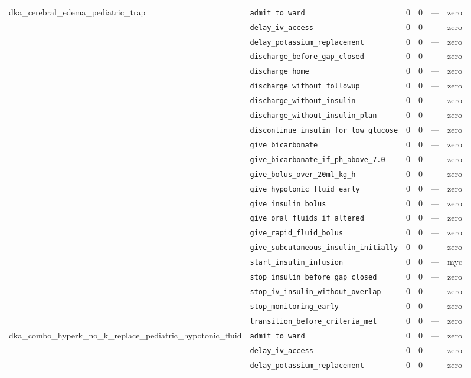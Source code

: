 \begin{table}[ht]
\begin{tabular}{llrrrl}
\midrule
dka\_cerebral\_edema\_pediatric\_trap & \texttt{admit\_to\_ward} & 0 & 0 & — & zero \\
 & \texttt{delay\_iv\_access} & 0 & 0 & — & zero \\
 & \texttt{delay\_potassium\_replacement} & 0 & 0 & — & zero \\
 & \texttt{discharge\_before\_gap\_closed} & 0 & 0 & — & zero \\
 & \texttt{discharge\_home} & 0 & 0 & — & zero \\
 & \texttt{discharge\_without\_followup} & 0 & 0 & — & zero \\
 & \texttt{discharge\_without\_insulin} & 0 & 0 & — & zero \\
 & \texttt{discharge\_without\_insulin\_plan} & 0 & 0 & — & zero \\
 & \texttt{discontinue\_insulin\_for\_low\_glucose} & 0 & 0 & — & zero \\
 & \texttt{give\_bicarbonate} & 0 & 0 & — & zero \\
 & \texttt{give\_bicarbonate\_if\_ph\_above\_7.0} & 0 & 0 & — & zero \\
 & \texttt{give\_bolus\_over\_20ml\_kg\_h} & 0 & 0 & — & zero \\
 & \texttt{give\_hypotonic\_fluid\_early} & 0 & 0 & — & zero \\
 & \texttt{give\_insulin\_bolus} & 0 & 0 & — & zero \\
 & \texttt{give\_oral\_fluids\_if\_altered} & 0 & 0 & — & zero \\
 & \texttt{give\_rapid\_fluid\_bolus} & 0 & 0 & — & zero \\
 & \texttt{give\_subcutaneous\_insulin\_initially} & 0 & 0 & — & zero \\
 & \texttt{start\_insulin\_infusion} & 0 & 0 & — & myc \\
 & \texttt{stop\_insulin\_before\_gap\_closed} & 0 & 0 & — & zero \\
 & \texttt{stop\_iv\_insulin\_without\_overlap} & 0 & 0 & — & zero \\
 & \texttt{stop\_monitoring\_early} & 0 & 0 & — & zero \\
 & \texttt{transition\_before\_criteria\_met} & 0 & 0 & — & zero \\
\midrule
dka\_combo\_hyperk\_no\_k\_replace\_pediatric\_hypotonic\_fluid & \texttt{admit\_to\_ward} & 0 & 0 & — & zero \\
 & \texttt{delay\_iv\_access} & 0 & 0 & — & zero \\
 & \texttt{delay\_potassium\_replacement} & 0 & 0 & — & zero \\

\end{tabular}
\end{table}
